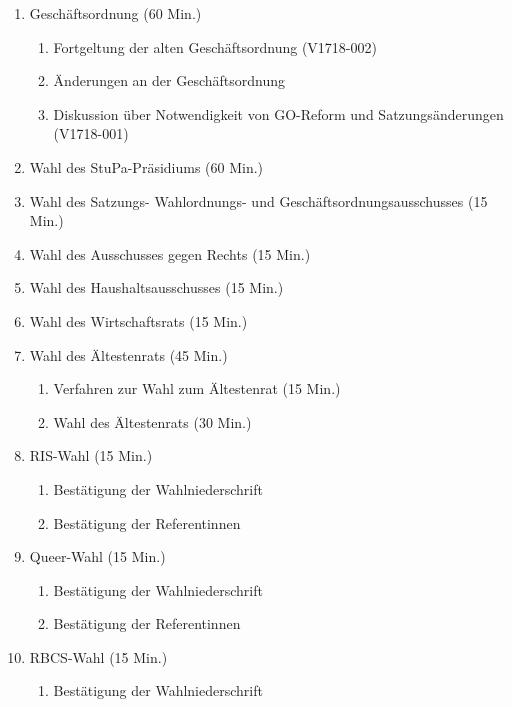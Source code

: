 \documentclass[ngerman,headheight=70pt]{scrartcl}
\begin{document}
    \begin{enumerate}[label={\textbf{Top \theenumi}},leftmargin=*]
        \item Geschäftsordnung (60 Min.)
            \begin{enumerate}
                \item Fortgeltung der alten Geschäftsordnung (V1718-002)
                \item Änderungen an der Geschäftsordnung
                \item Diskussion über Notwendigkeit von GO-Reform und Satzungsänderungen (V1718-001)
            \end{enumerate}
        \item Wahl des StuPa-Präsidiums (60 Min.)
        \item Wahl des Satzungs- Wahlordnungs- und  Geschäftsordnungsausschusses (15 Min.)
        \item Wahl des Ausschusses gegen Rechts (15 Min.)
        \item Wahl des Haushaltsausschusses (15 Min.)
        \item Wahl des Wirtschaftsrats (15 Min.)
        \item Wahl des Ältestenrats (45 Min.)
            \begin{enumerate}
                \item Verfahren zur Wahl zum Ältestenrat (15 Min.)
                \item Wahl des Ältestenrats (30 Min.)
            \end{enumerate}
        \item RIS-Wahl (15 Min.)
            \begin{enumerate}
                \item Bestätigung der Wahlniederschrift
                \item Bestätigung der Referentinnen
            \end{enumerate}
        \item Queer-Wahl (15 Min.)
            \begin{enumerate}
                \item Bestätigung der Wahlniederschrift
                \item Bestätigung der Referentinnen
            \end{enumerate}
        \item RBCS-Wahl (15 Min.)
            \begin{enumerate}
                \item Bestätigung der Wahlniederschrift

\end{enumerate}
\end{enumerate}
\end{document}
